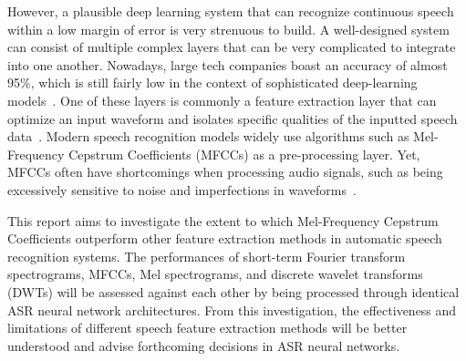 \par
However, a plausible deep learning system that can recognize continuous speech within a low margin of error is very strenuous to build. A well-designed system can consist of multiple complex layers that can be very complicated to integrate into one another. Nowadays, large tech companies boast an accuracy of almost 95\%, which is still fairly low in the context of sophisticated deep-learning models~\cite{sonix_authors_2022}. One of these layers is commonly a feature extraction layer that can optimize an input waveform and isolates specific qualities of the inputted speech data~\cite{janse_magre_kurzekar_deshmukh_2014,ajibola_alim_khair_alang_rashid_2018}. Modern speech recognition models widely use algorithms such as Mel-Frequency Cepstrum Coefficients (MFCCs) as a pre-processing layer. Yet, MFCCs often have shortcomings when processing audio signals, such as being excessively sensitive to noise and imperfections in waveforms~\cite{janse_magre_kurzekar_deshmukh_2014}.
\par
This report aims to investigate the extent to which Mel-Frequency Cepstrum Coefficients outperform other feature extraction methods in automatic speech recognition systems. The performances of short-term Fourier transform spectrograms, MFCCs, Mel spectrograms, and discrete wavelet transforms (DWTs) will be assessed against each other by being processed through identical ASR neural network architectures. From this investigation, the effectiveness and limitations of different speech feature extraction methods will be better understood and advise forthcoming decisions in ASR neural networks.